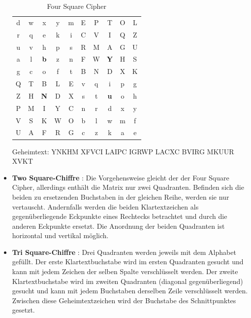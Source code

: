 \begin{refsegment}
\begin{itemize}
   \begin{table}[ht]
   \begin{center}
   \begin{tabular}{|ccccc|ccccc|}
   \hline
	d & w & x & y & m & E & P & T & O & L\\
	r & q & e & k & i & C & V & I & Q & Z\\
	u & v & h & p & s & R & M & A & G & U\\
	a & l & \textbf{b} & z & n & F & W & \textbf{Y} & H & S\\
	g & c & o & f & t & B & N & D & X & K\\
   \hline
	Q & T & B & L & E & v & q & i & p & g\\
	Z & H & \textbf{N} & D & X & s & t & \textbf{u} & o & h\\
	P & M & I & Y & C & n & r & d & x & y\\
	V & S & K & W & O & b & l & w & m & f\\
	U & A & F & R & G & c & z & k & a & e\\
   \hline
   \end{tabular}
   \caption{Four Square Cipher}
   \label{Four-Square-Cipher-table-reference}
   \end{center}
   \end{table}

   Geheimtext:  YNKHM XFVCI LAIPC IGRWP LACXC BVIRG MKUUR XVKT\\


\item \textbf{Two Square-Chiffre} \cite{Savard1999}:
   Die Vorgehensweise gleicht der der Four Square Cipher, allerdings enthält
   die Matrix nur zwei Quadranten. Befinden sich die beiden zu ersetzenden
   Buchstaben in der gleichen Reihe, werden sie nur vertauscht. Andernfalls
   werden die beiden Klartextzeichen als gegenüberliegende Eckpunkte eines
   Rechtecks betrachtet und durch die anderen Eckpunkte ersetzt. Die Anordnung
   der beiden Quadranten ist horizontal und vertikal möglich.


\item \textbf{Tri Square-Chiffre} \cite{ACA2002}:
   Drei Quadranten werden jeweils mit dem Alphabet gefüllt. Der erste
   Klartextbuchstabe wird im ersten Quadranten gesucht und kann mit jedem
   Zeichen der selben Spalte verschlüsselt werden. Der zweite
   Klartextbuchstabe wird im zweiten Quadranten (diagonal gegenüberliegend)
   gesucht und kann mit jedem Buchstaben derselben Zeile verschlüsselt werden.
   Zwischen diese Geheimtextzeichen wird der Buchstabe des Schnittpunktes
   gesetzt.


\end{itemize}
\end{refsegment}
